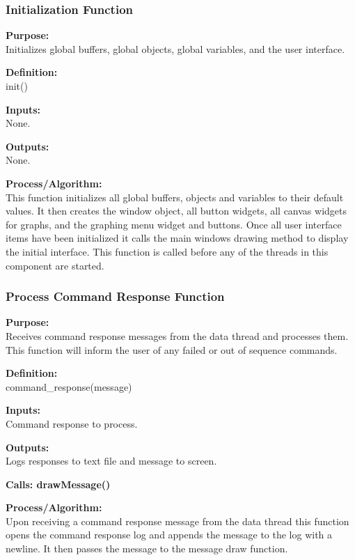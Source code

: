 \documentclass[10pt,draftclsnofoot,onecolumn,compsoc]{IEEEtran}
\begin{document}
\subsubsection{Initialization Function}
{\bf Purpose:} \\
Initializes global buffers, global objects, global variables, and the user interface. \par
{\bf Definition:} \\ 
init() \par
{\bf Inputs:} \\ None. \par
{\bf Outputs:} \\None. \par
{\bf Process/Algorithm:} \\
This function initializes all global buffers, objects and variables to their default values. It then creates the window object, all button widgets, all canvas widgets for graphs, and the graphing menu widget and buttons. Once all user interface items have been initialized it calls the main windows drawing method to display the initial interface. This function is called before any of the threads in this component are started. \par

\subsubsection{Process Command Response Function}
{\bf Purpose:} \\
Receives command response messages from the data thread and processes them. This function will inform the user of any failed or out of sequence commands.  \par
{\bf Definition:} \\ 
command\_response(message) \par
{\bf Inputs:} \\  Command response to process. \par
{\bf Outputs:} \\ Logs responses to text file and message to screen. \par
{\bf Calls: drawMessage()}\par
{\bf Process/Algorithm:} \\
Upon receiving a command response message from the data thread this function opens the command response log and appends the message to the log with a newline. It then passes the message to the message draw function. \par
\end{document}
